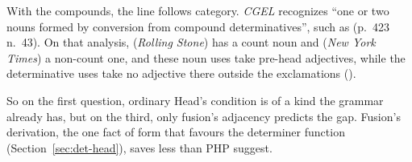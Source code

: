 With the compounds, the line follows category. \textit{CGEL} recognizes \enquote{one or two nouns formed by conversion from compound determinatives}, such as  (p.~423 n.~43). On that analysis,  (\textit{Rolling Stone}) has a count noun and  (\textit{New York Times}) a non-count one, and these noun uses take pre-head adjectives, while the determinative uses take no adjective there outside the exclamations ().

So on the first question, ordinary Head's condition is of a kind the grammar already has, but on the third, only fusion's adjacency predicts the gap. Fusion's derivation, the one fact of form that favours the determiner function (Section~\ref{sec:det-head}), saves less than PHP suggest.
